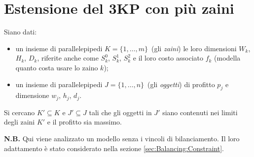 \section{Estensione del 3KP con più zaini}
\label{sec:extension1}

Siano dati:
\begin{itemize} 
	
	\item un insieme di parallelepipedi $K = \{1, \dots, m \}$\ 
	(gli \emph{zaini}) le loro dimensioni $W_k$, $H_k$, $D_k$, riferite
	anche come $S_k^0$, $S_k^1$, $S_k^2$ e il loro costo 
	associato $f_k$ (modella quanto costa usare lo zaino $k$);
	\item un insieme di parallelepipedi $J = \{1, \dots, n\}$\ 
	(gli \emph{oggetti}) di profitto $p_j$ e dimensione $w_j$, $h_j$, $d_j$.
\end{itemize}

Si cercano $K' \subseteq K$ e $J' \subseteq J$ tali che gli oggetti in $J'$ 
siano contenuti nei limiti degli zaini $K'$ e il profitto sia massimo.


\textbf{N.B.} Qui viene analizzato un modello senza i vincoli di 
bilanciamento.
Il loro adattamento è stato considerato nella sezione 
\ref{sec:Balancing:Constraint}.


